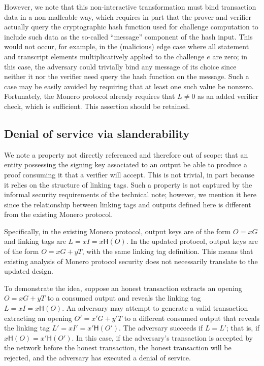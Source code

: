 \documentclass{article}
\theoremstyle{definition}
\newcommand{\hash}{\mathsf{H}}
\begin{document}
However, we note that this non-interactive transformation must bind transaction data in a non-malleable way, which requires in part that the prover and verifier actually query the cryptographic hash function used for challenge computation to include such data as the so-called ``message'' component of the hash input.
This would not occur, for example, in the (malicious) edge case where all statement and transcript elements multiplicatively applied to the challenge $e$ are zero; in this case, the adversary could trivially bind any message of its choice since neither it nor the verifier need query the hash function on the message.
Such a case may be easily avoided by requiring that at least one such value be nonzero.
Fortunately, the Monero protocol already requires that $L \neq 0$ as an added verifier check, which is sufficient.
This assertion should be retained.


\subsection{Denial of service via slanderability}

We note a property not directly referenced and therefore out of scope: that an entity possessing the signing key associated to an output be able to produce a proof consuming it that a verifier will accept.
This is not trivial, in part because it relies on the structure of linking tags.
Such a property is not captured by the informal security requirements of the technical note; however, we mention it here since the relationship between linking tags and outputs defined here is different from the existing Monero protocol.

Specifically, in the existing Monero protocol, output keys are of the form $O = x G$ and linking tags are $L = x I = x \hash(O)$.
In the updated protocol, output keys are of the form $O = x G + y T$, with the same linking tag definition.
This means that existing analysis of Monero protocol security does not necessarily translate to the updated design.

To demonstrate the idea, suppose an honest transaction extracts an opening $O = x G + y T$ to a consumed output and reveals the linking tag $L = x I = x \hash(O)$.
An adversary may attempt to generate a valid transaction extracting an opening $O' = x' G + y' T$ to a different consumed output that reveals the linking tag $L' = x I' = x' \hash(O')$.
The adversary succeeds if $L = L'$; that is, if $x \hash(O) = x' \hash(O')$.
In this case, if the adversary's transaction is accepted by the network before the honest transaction, the honest transaction will be rejected, and the adversary has executed a denial of service.
\end{document}
